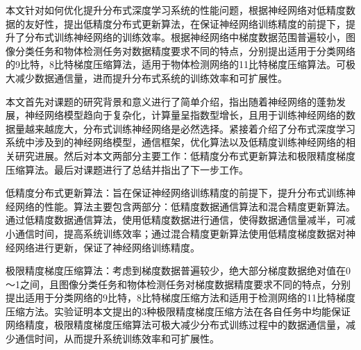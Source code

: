 

\begin{last_words}
  本文针对如何优化提升分布式深度学习系统的性能问题，根据神经网络对低精度数据的友好性，提出低精度分布式更新算法，在保证神经网络训练精度的前提下，提升了分布式训练神经网络的训练效率。根据神经网络中梯度数据范围普遍较小，图像分类任务和物体检测任务对数据精度要求不同的特点，分别提出适用于分类网络的9比特，8比特梯度压缩算法，适用于物体检测网络的11比特梯度压缩算法。可极大减少数据通信量，进而提升分布式系统的训练效率和可扩展性。

  本文首先对课题的研究背景和意义进行了简单介绍，指出随着神经网络的蓬勃发展，神经网络模型趋向于复杂化，计算量呈指数型增长，且用于训练神经网络的数据量越来越庞大，分布式训练神经网络是必然选择。紧接着介绍了分布式深度学习系统中涉及到的神经网络模型，通信框架，优化算法以及低精度训练神经网络的相关研究进展。然后对本文两部分主要工作：低精度分布式更新算法和极限精度梯度压缩算法。最后对课题进行了总结并指出了下一步工作。

  低精度分布式更新算法：旨在保证神经网络训练精度的前提下，提升分布式训练神经网络的性能。算法主要包含两部分：低精度数据通信算法和混合精度更新算法。通过低精度数据通信算法，使用低精度数据进行通信，使得数据通信量减半，可减小通信时间，提高系统训练效率；通过混合精度更新算法使用低精度梯度数据对神经网络进行更新，保证了神经网络训练精度。

  极限精度梯度压缩算法：考虑到梯度数据普遍较少，绝大部分梯度数据绝对值在0～1之间，且图像分类任务和物体检测任务对梯度数据精度要求不同的特点，分别提出适用于分类网络的9比特，8比特梯度压缩方法和适用于检测网络的11比特梯度压缩方法。实验证明本文提出的3种极限精度梯度压缩方法在各自任务中均能保证网络精度，极限精度梯度压缩算法可极大减少分布式训练过程中的数据通信量，减少通信时间，从而提升系统训练效率和可扩展性。

\end{last_words}

